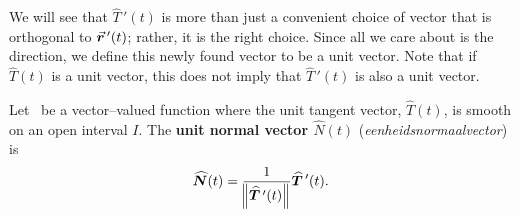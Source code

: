 We will see that $\widehat T\,'(t)$ is more than just a convenient choice of vector that is orthogonal to $\vrp(t)$; rather, it is the right choice. Since all we care about is the direction, we define this newly found vector to be a unit vector. Note that if $\widehat T(t)$ is a unit vector, this does not imply that $\widehat T\,'(t)$ is also a unit vector.


\begin{definition}\label{def:unit_normal}
Let \vrt\ be a vector--valued function where the unit tangent vector, $\widehat T(t)$, is smooth on an open interval $I$. The \textbf{unit normal vector $\widehat N(t)$} (\textit{eenheidsnormaalvector}) is
$$\widehat N(t) = \frac1{\norm{\widehat T\,'(t)}}\widehat T\,'(t).$$
\end{definition}



